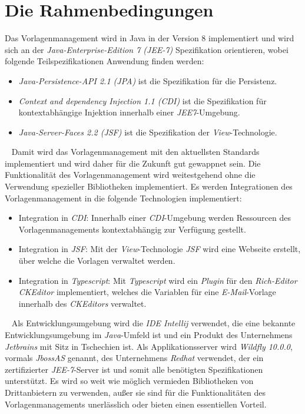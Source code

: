 \section{Die Rahmenbedingungen}
Das Vorlagenmanagement wird in Java in der Version 8 implementiert und wird sich an der \emph{Java-Enterprise-Edition 7 (JEE-7)} Spezifikation orientieren, wobei folgende Teilspezifikationen Anwendung finden werden:
\begin{itemize}
	\item \emph{Java-Persistence-API 2.1 (JPA)} ist die Spezifikation für die Persistenz.
	\item \emph{Context and dependency Injection 1.1 (CDI)} ist die Spezifikation für kontextabhängige Injektion innerhalb einer \emph{JEE7}-Umgebung.
	\item \emph{Java-Server-Faces 2.2 (JSF)} ist die Spezifikation der \emph{View}-Technologie. 
\end{itemize}
\ \newline
Damit wird das Vorlagenmanagement mit den aktuellsten Standards implementiert und wird daher für die Zukunft gut gewappnet sein. Die Funktionalität des Vorlagenmanagement wird weitestgehend ohne die Verwendung spezieller Bibliotheken implementiert. Es werden Integrationen des Vorlagenmanagement in die folgende Technologien implementiert:
\begin{itemize}
	\item Integration in \emph{CDI}:
	\newline
	Innerhalb einer \emph{CDI}-Umgebung werden Ressourcen des Vorlagenmanagements kontextabhängig zur Verfügung gestellt.
	\item Integration in \emph{JSF}:
	\newline
	Mit der \emph{View}-Technologie \emph{JSF} wird eine Webseite erstellt, über welche die Vorlagen verwaltet werden.
	\item Integration in \emph{Typescript}:
	\newline
	Mit \emph{Typescript} wird ein \emph{Plugin} für den \emph{Rich-Editor CKEditor} implementiert, welches die Variablen für eine \emph{E-Mail}-Vorlage innerhalb des \emph{CKEditors} verwaltet.
\end{itemize} 
\ \newline
Als Entwicklungsumgebung wird die \emph{IDE Intellij} verwendet, die eine bekannte Entwicklungsumgebung im \emph{Java}-Umfeld ist und ein Produkt des Unternehmens \emph{Jetbrains} mit Sitz in Tschechien ist. Als Applikationsserver wird \emph{Wildfly 10.0.0}, vormals \emph{JbossAS} genannt, des Unternehmens  \emph{Redhat} verwendet, der ein zertifizierter \emph{JEE-7}-Server ist und somit alle benötigten Spezifikationen unterstützt. Es wird so weit wie möglich vermieden Bibliotheken von Drittanbietern zu verwenden, außer sie sind für die Funktionalitäten des Vorlagenmanagements unerlässlich oder bieten einen essentiellen Vorteil.
